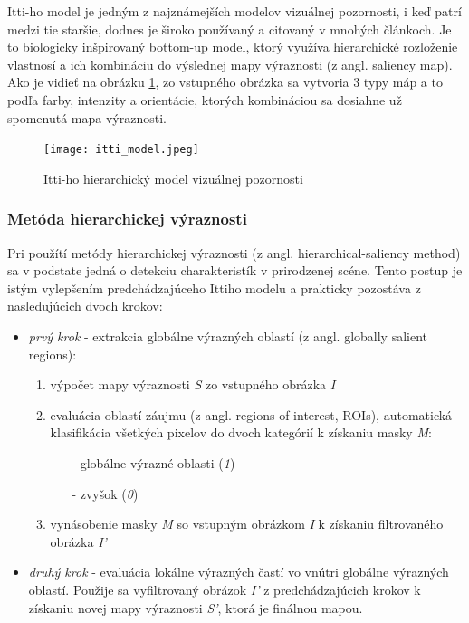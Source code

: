 Itti-ho model\cite{itti} je jedným z najznámejších modelov vizuálnej pozornosti, i keď patrí medzi tie staršie, dodnes je široko používaný a citovaný v mnohých článkoch. Je to biologicky inšpirovaný bottom-up model, ktorý využíva hierarchické rozloženie vlastnosí a ich kombináciu do výslednej mapy výraznosti (z angl. saliency map). Ako je vidieť na obrázku \ref{itti_image}, zo vstupného obrázka sa vytvoria 3 typy máp a to podľa farby, intenzity a orientácie, ktorých kombináciou sa dosiahne už spomenutá mapa výraznosti. 

\begin{figure}[H]
	\begin{center}
		\texttt{[image: itti\_model.jpeg]}
	\end{center}
	\caption[Itti-ho hierarchický model vizuálnej pozornosti]{Itti-ho hierarchický model vizuálnej pozornosti\cite{itti}\label{itti_image}}
\end{figure}

\subsubsection{Metóda hierarchickej výraznosti}

Pri použítí metódy hierarchickej výraznosti (z angl. hierarchical-saliency method\cite{gao2013hierarchical}) sa v podstate jedná o detekciu charakteristík v prirodzenej scéne. Tento postup je istým vylepšením predchádzajúceho Ittiho modelu a prakticky pozostáva z nasledujúcich dvoch krokov:

\begin{itemize}
	\item \textit{prvý krok} - extrakcia globálne výrazných oblastí (z angl. globally salient
	regions):
		\begin{enumerate}
			\item výpočet mapy výraznosti \textit{S} zo vstupného obrázka \textit{I}
			\item evaluácia oblastí záujmu (z angl. regions of interest, ROIs), automatická
			klasifikácia všetkých pixelov do dvoch kategórií k získaniu masky \textit{M}:
			\begin{itemize}
				\item[-] globálne výrazné oblasti (\textit{1})
				\item[-] zvyšok (\textit{0})
			\end{itemize}
			\item vynásobenie masky \textit{M} so vstupným obrázkom \textit{I} k získaniu filtrovaného
			obrázka \textit{I'}
		\end{enumerate}
	\item \textit{druhý krok} - evaluácia lokálne výrazných častí vo vnútri globálne výrazných
	oblastí. Použije sa vyfiltrovaný obrázok \textit{I'} z predchádzajúcich krokov k získaniu novej mapy výraznosti \textit{S'}, ktorá je finálnou mapou.
\end{itemize}
	

